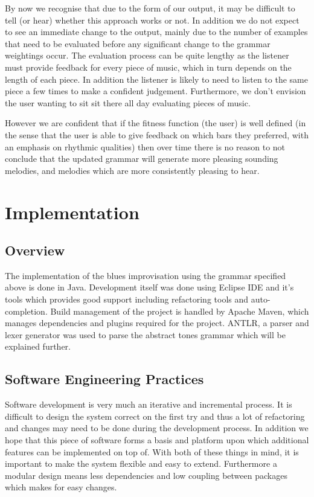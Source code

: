 \documentclass[pdftex,12pt,a4paper]{report}
\begin{document}
By now we recognise that due to the form of our output, it may be difficult to tell (or hear) whether this approach works or not. In addition we do not expect to see an immediate change to the output, mainly due to the number of examples that need to be evaluated before any significant change to the grammar weightings occur. The evaluation process can be quite lengthy as the listener must provide feedback for every piece of music, which in turn depends on the length of each piece. In addition the listener is likely to need to listen to the same piece a few times to make a confident judgement. Furthermore, we don't envision the user wanting to sit sit there all day evaluating pieces of music.

However we are confident that if the fitness function (the user) is well defined (in the sense that the user is able to give feedback on which bars they preferred, with an emphasis on rhythmic qualities) then over time there is no reason to not conclude that the updated grammar will generate more pleasing sounding melodies, and melodies which are more consistently pleasing to hear.


\chapter{Implementation}

\section{Overview}
The implementation of the blues improvisation using the grammar specified above is done in Java. Development itself was done using Eclipse IDE and it's tools which provides good support including refactoring tools and auto-completion. Build management of the project is handled by Apache Maven, which manages dependencies and plugins required for the project. ANTLR, a parser and lexer generator was used to parse the abstract tones grammar which will be explained further.

\section{Software Engineering Practices}
Software development is very much an iterative and incremental process. It is difficult to design the system correct on the first try and thus a lot of refactoring and changes may need to be done during the development process. In addition we hope that this piece of software forms a basis and platform upon which additional features can be implemented on top of. With both of these things in mind, it is important to make the system flexible and easy to extend. Furthermore a modular design means less dependencies and low coupling between packages which makes for easy changes. 
\end{document}
